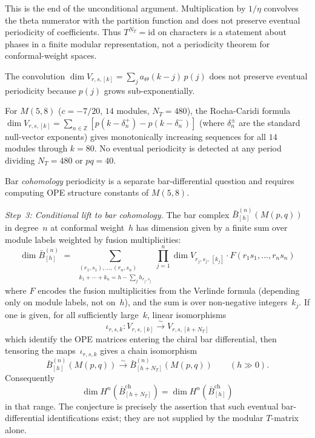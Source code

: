 \begin{evidence}
This is the end of the unconditional argument. Multiplication by
$1/\eta$ convolves the theta numerator with the partition function and
does not preserve eventual periodicity of coefficients. Thus
$T^{N_T}=\mathrm{id}$ on characters is a statement about phases in a finite
modular representation, not a periodicity theorem for conformal-weight
spaces.

\begin{remark}
\label{rem:step2-stabilization-threshold}
The convolution $\dim V_{r,s,[k]} = \sum_j a_\Theta(k-j)\, p(j)$ does not preserve eventual periodicity because $p(j)$ grows sub-exponentially.

\begin{computation}
\label{comp:m58-weight-space-periodicity}
For $M(5,8)$ ($c = -7/20$, $14$ modules, $N_T = 480$), the Rocha-Caridi formula
$\dim V_{r,s,[k]} = \sum_{n \in \mathbb{Z}} [p(k - \delta^+_n) - p(k - \delta^-_n)]$
(where $\delta^\pm_n$ are the standard null-vector exponents)
gives monotonically increasing sequences for all $14$ modules through $k = 80$. No eventual periodicity is detected at any period dividing $N_T = 480$ or $pq = 40$.
\end{computation}

Bar \emph{cohomology} periodicity is a separate bar-differential
question and requires computing OPE structure constants of $M(5,8)$.
\end{remark}

\emph{Step~3: Conditional lift to bar cohomology.}
The bar complex $\bar{B}^{(n)}_{[h]}(M(p,q))$ in degree~$n$ at conformal
weight~$h$ has dimension given by a finite sum over module labels weighted
by fusion multiplicities:
\[
\dim \bar{B}^{(n)}_{[h]} \;=\; \sum_{\substack{(r_1,s_1),\ldots,(r_n,s_n) \\
k_1 + \cdots + k_n = h - \sum_j h_{r_j,s_j}}}
\prod_{j=1}^n \dim V_{r_j,s_j,\,[k_j]}
\cdot F(r_1 s_1, \ldots, r_n s_n)
\]
where $F$ encodes the fusion multiplicities from the Verlinde formula
(depending only on module labels, not on~$h$), and the sum is over
non-negative integers~$k_j$. If one is given, for all sufficiently
large~$k$, linear isomorphisms
\[
\iota_{r,s,k}\colon V_{r,s,[k]}\xrightarrow{\sim}V_{r,s,[k+N_T]}
\]
which identify the OPE matrices entering the chiral bar differential,
then tensoring the maps~$\iota_{r,s,k}$ gives a chain isomorphism
\[
\bar B^{(n)}_{[h]}(M(p,q))\xrightarrow{\sim}
\bar B^{(n)}_{[h+N_T]}(M(p,q))
\qquad(h\gg0).
\]
Consequently
\[
\dim H^n(\bar{B}_{[h+N_T]}^{\mathrm{ch}})
= \dim H^n(\bar{B}_{[h]}^{\mathrm{ch}})
\]
in that range. The conjecture is precisely the assertion that such
eventual bar-differential identifications exist; they are not supplied
by the modular $T$-matrix alone.
\end{evidence}

